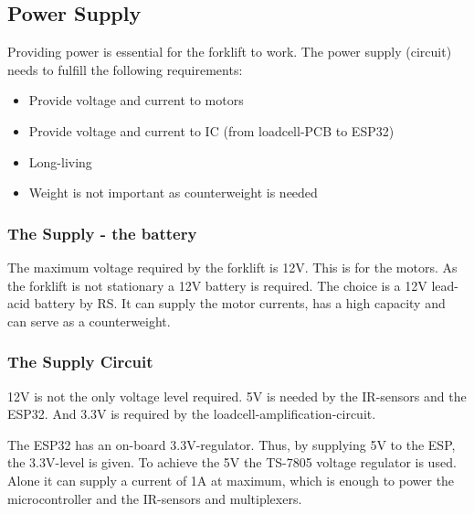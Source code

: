 \documentclass[../report.tex]{subfiles}
\begin{document}
\subsection{Power Supply}
Providing power is essential for the forklift to work. The power supply (circuit)
needs to fulfill the following requirements:
\begin{itemize}
    \item Provide voltage and current to motors
    \item Provide voltage and current to IC (from loadcell-PCB to ESP32)
    \item Long-living
    \item Weight is not important as counterweight is needed
\end{itemize} 
\subsubsection{The Supply - the battery}
The maximum voltage required by the forklift is 12V. This is for the motors. As the forklift
is not stationary a 12V battery is required. The choice is a 12V lead-acid 
battery by RS. It can supply the motor currents, has a high capacity and can serve as a counterweight.
\subsubsection{The Supply Circuit}
12V is not the only voltage level required. 5V is needed by the IR-sensors and the ESP32. And 3.3V is required
by the loadcell-amplification-circuit.

The ESP32 has an on-board 3.3V-regulator. Thus, by supplying 5V to the ESP, the 3.3V-level is given.
To achieve the 5V the TS-7805 voltage regulator is used. Alone it can supply a current of 1A at maximum, which
is enough to power the microcontroller and the IR-sensors and multiplexers.
\end{document}
